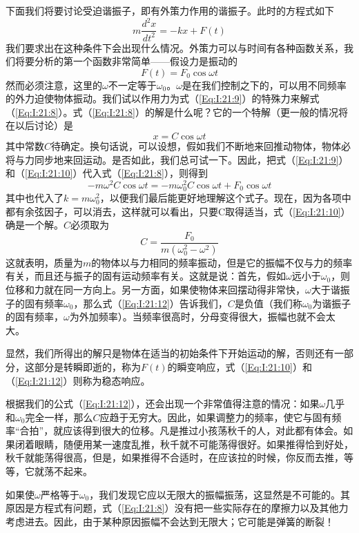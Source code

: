 下面我们将要讨论受迫谐振子，即有外策力作用的谐振子。此时的方程式如下
\begin{equation}
    \label{Eq:I:21:8}
    m\frac{d^2x}{dt^2}=-kx+F(t)
\end{equation}
我们要求出在这种条件下会出现什么情况。外策力可以与时间有各种函数关系，我们将要分析的第一个函数非常简单——假设力是振动的
\begin{equation}
    \label{Eq:I:21:9}
    F(t)=F_0\cos\omega t
\end{equation}
然而必须注意，这里的$\omega$不一定等于$\omega_0$。$\omega$是在我们控制之下的，可以用不同频率的外力迫使物体振动。我们试以作用力为式（\ref{Eq:I:21:9}）的特殊力来解式（\ref{Eq:I:21:8}）。式（\ref{Eq:I:21:8}）的解是什么呢？它的一个特解（更一般的情况将在以后讨论）是
\begin{equation}
    \label{Eq:I:21:10}
    x=C\cos\omega t
\end{equation}
其中常数$C$待确定。换句话说，可以设想，假如我们不断地来回推动物体，物体必将与力同步地来回运动。是否如此，我们总可试一下。因此，把式（\ref{Eq:I:21:9}）和（\ref{Eq:I:21:10}）代入式（\ref{Eq:I:21:8}），则得到
\begin{equation}
    \label{Eq:I:21:11}
    -m\omega^2C\cos\omega t = -m\omega_0^2 C\cos\omega t + F_0\cos\omega t
\end{equation}
其中也代入了$k=m\omega_0^2$，以便我们最后能更好地理解这个式子。现在，因为各项中都有余弦因子，可以消去，这样就可以看出，只要C取得适当，式（\ref{Eq:I:21:10}）确是一个解。$C$必须取为
\begin{equation}
    \label{Eq:I:21:12}
    C=\frac{F_0}{m(\omega_0^2 - \omega^2)}
\end{equation}
这就表明，质量为$m$的物体以与力相同的频率振动，但是它的振幅不仅与力的频率有关，而且还与振子的固有运动频率有关。这就是说：首先，假如$\omega$远小于$\omega_0$，则位移和力就在同一方向上。另一方面，如果使物体来回摆动得非常快，$\omega$大于谐振子的固有频率$\omega_0$，那么式（\ref{Eq:I:21:12}）告诉我们，$C$是负值（我们称$\omega_0$为谐振子的固有频率，$\omega$为外加频率）。当频率很高时，分母变得很大，振幅也就不会太大。

显然，我们所得出的解只是物体在适当的初始条件下开始运动的解，否则还有一部分，这部分是转瞬即逝的，称为$F(t)$的瞬变响应，式（\ref{Eq:I:21:10}）和（\ref{Eq:I:21:12}）则称为稳态响应。

根据我们的公式（\ref{Eq:I:21:12}），还会出现一个非常值得注意的情况：如果$\omega$几乎和$\omega_0$完全一样，那么$C$应趋于无穷大。因此，如果调整力的频率，使它与固有频率“合拍”，就应该得到很大的位移。凡是推过小孩荡秋千的人，对此都有体会。如果闭着眼睛，随便用某一速度乱推，秋千就不可能荡得很好。如果推得恰到好处，秋千就能荡得很高，但是，如果推得不合适时，在应该拉的时候，你反而去推，等等，它就荡不起来。

如果使$\omega$严格等于$\omega_0$，我们发现它应以无限大的振幅振荡，这显然是不可能的。其原因是方程式有问题，式（\ref{Eq:I:21:8}）没有把一些实际存在的摩擦力以及其他力考虑进去。因此，由于某种原因振幅不会达到无限大；它可能是弹簧的断裂！